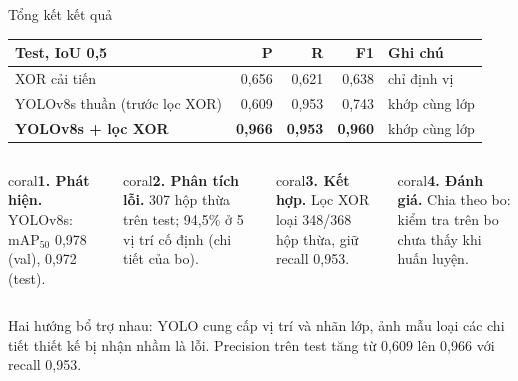 \documentclass[aspectratio=169,11pt,t]{beamer}
\newcommand{\hdr}[1]{{\bfseries\color{muted}#1}}
\begin{document}
\begin{frame}[label=summary]{Tổng kết kết quả}
  \footnotesize
  \renewcommand{\arraystretch}{1.3}\setlength{\tabcolsep}{5pt}
  \begin{tabular}{@{}L{5.0cm}rrr L{2.6cm}@{}}
    \toprule
    \hdr{Test, IoU 0,5} & \hdr{P} & \hdr{R} & \hdr{F1} & \hdr{Ghi chú} \\
    \midrule
    XOR cải tiến & 0,656 & 0,621 & 0,638 & chỉ định vị \\
    YOLOv8s thuần (trước lọc XOR) & 0,609 & 0,953 & 0,743 & khớp cùng lớp \\
    \textbf{YOLOv8s + lọc XOR} & \textbf{0,966} & \textbf{0,953} & \textbf{0,960} & khớp cùng lớp \\
    \bottomrule
  \end{tabular}
  \vspace{3pt}

  \begin{columns}[T,onlytextwidth]
    \begin{column}{0.235\textwidth}
      \begin{card}[height=2.6cm]{coral}\scriptsize \textbf{1. Phát hiện.} YOLOv8s: $\mathrm{mAP}_{50}$ 0,978 (val), 0,972 (test).\end{card}
    \end{column}
    \begin{column}{0.235\textwidth}
      \begin{card}[height=2.6cm]{coral}\scriptsize \textbf{2. Phân tích lỗi.} 307 hộp thừa trên test; 94,5\% ở 5 vị trí cố định (chi tiết của bo).\end{card}
    \end{column}
    \begin{column}{0.235\textwidth}
      \begin{card}[height=2.6cm]{coral}\scriptsize \textbf{3. Kết hợp.} Lọc XOR loại 348/368 hộp thừa, giữ recall 0,953.\end{card}
    \end{column}
    \begin{column}{0.235\textwidth}
      \begin{card}[height=2.6cm]{coral}\scriptsize \textbf{4. Đánh giá.} Chia theo bo: kiểm tra trên bo chưa thấy khi huấn luyện.\end{card}
    \end{column}
  \end{columns}
  \vspace{4pt}
  \begin{key}
    \small Hai hướng bổ trợ nhau: YOLO cung cấp vị trí và nhãn lớp, ảnh mẫu loại các chi tiết thiết kế bị nhận nhầm là lỗi. Precision trên test tăng từ 0,609 lên 0,966 với recall 0,953.
  \end{key}
\end{frame}
\end{document}

